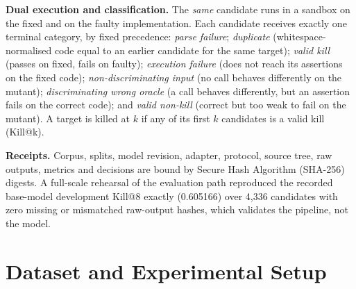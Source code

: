 \documentclass[10pt,conference,letterpaper]{IEEEtran}
\makeatletter
\newcommand{\killk}[1]{Kill@#1}
\makeatother
\begin{document}
\textbf{Dual execution and classification.} The \emph{same} candidate runs in a
sandbox on the fixed and on the faulty implementation. Each candidate receives exactly
one terminal category, by fixed precedence: \emph{parse failure};
\emph{duplicate} (whitespace-normalised code equal to an earlier candidate for the same
target); \emph{valid kill} (passes on fixed, fails on faulty); \emph{execution
failure} (does not reach its assertions on the fixed code); \emph{non-discriminating
input} (no call behaves differently on the mutant); \emph{discriminating wrong oracle}
(a call behaves differently, but an assertion fails on the correct code); and
\emph{valid non-kill} (correct but too weak to fail on the mutant). A target is
killed at $k$ if any of its first $k$ candidates is a valid kill (\killk{k}).

\textbf{Receipts.} Corpus, splits, model revision, adapter, protocol, source tree,
raw outputs, metrics and decisions are bound by Secure Hash Algorithm (SHA-256)
digests. A full-scale rehearsal of the evaluation path reproduced the recorded
base-model development \killk{8} exactly (0.605166) over 4,336 candidates with zero
missing or mismatched raw-output hashes, which validates the pipeline, not the model.

\section{Dataset and Experimental Setup}
\end{document}
